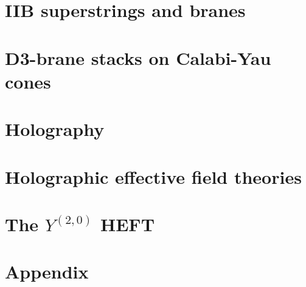 \documentclass[11pt,a4paper,oneside,openright,titlepage]{book}
\author{Riccardo Antonelli}
\begin{document}
\frontmatter




\tableofcontents

\mainmatter



\chapter{IIB superstrings and branes}



\chapter{D3-brane stacks on Calabi-Yau cones}



\chapter{Holography}



\chapter{Holographic effective field theories}



\chapter{The $Y^{(2,0)}$ HEFT}



\appendix

\chapter{Appendix}




\backmatter



\end{document}
